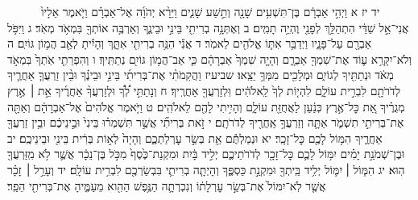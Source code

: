 \documentclass[twoside, openany, parskip=half, 11pt]{book}
\begin{document}
　　　יד יז א וַיְהִ֣י אַבְרָ֔ם בֶּן־תִּשְׁעִ֥ים שָׁנָ֖ה וְתֵ֣שַׁע שָׁנִ֑ים וַיֵּרָ֨א יְהֹוָ֜ה אֶל־אַבְרָ֗ם וַיֹּ֤אמֶר אֵלָיו֙ אֲנִי־אֵ֣ל שַׁדַּ֔י הִתְהַלֵּ֥ךְ לְפָנַ֖י וֶהְיֵ֥ה תָמִֽים׃ ב וְאֶתְּנָ֥ה בְרִיתִ֖י בֵּינִ֣י וּבֵינֶ֑ךָ וְאַרְבֶּ֥ה אוֹתְךָ֖ בִּמְאֹ֥ד מְאֹֽד׃ ג וַיִּפֹּ֥ל אַבְרָ֖ם עַל־פָּנָ֑יו וַיְדַבֵּ֥ר אִתּ֛וֹ אֱלֹהִ֖ים לֵאמֹֽר׃ ד אֲנִ֕י הִנֵּ֥ה בְרִיתִ֖י אִתָּ֑ךְ וְהָיִ֕יתָ לְאַ֖ב הֲמ֥וֹן גּוֹיִֽם׃ ה וְלֹא־יִקָּרֵ֥א ע֛וֹד אֶת־שִׁמְךָ֖ אַבְרָ֑ם וְהָיָ֤ה שִׁמְךָ֙ אַבְרָהָ֔ם כִּ֛י אַב־הֲמ֥וֹן גּוֹיִ֖ם נְתַתִּֽיךָ׃ ו וְהִפְרֵתִ֤י אֹֽתְךָ֙ בִּמְאֹ֣ד מְאֹ֔ד וּנְתַתִּ֖יךָ לְגוֹיִ֑ם וּמְלָכִ֖ים מִמְּךָ֥ יֵצֵֽאוּ׃ שביעיז וַהֲקִמֹתִ֨י אֶת־בְּרִיתִ֜י בֵּינִ֣י וּבֵינֶ֗ךָ וּבֵ֨ין זַרְעֲךָ֧ אַחֲרֶ֛יךָ לְדֹרֹתָ֖ם לִבְרִ֣ית עוֹלָ֑ם לִהְי֤וֹת לְךָ֙ לֵֽאלֹהִ֔ים וּֽלְזַרְעֲךָ֖ אַחֲרֶֽיךָ׃ ח וְנָתַתִּ֣י לְ֠ךָ֠ וּלְזַרְעֲךָ֨ אַחֲרֶ֜יךָ אֵ֣ת ׀ אֶ֣רֶץ מְגֻרֶ֗יךָ אֵ֚ת כׇּל־אֶ֣רֶץ כְּנַ֔עַן לַאֲחֻזַּ֖ת עוֹלָ֑ם וְהָיִ֥יתִי לָהֶ֖ם לֵאלֹהִֽים׃ ט וַיֹּ֤אמֶר אֱלֹהִים֙ אֶל־אַבְרָהָ֔ם וְאַתָּ֖ה אֶת־בְּרִיתִ֣י תִשְׁמֹ֑ר אַתָּ֛ה וְזַרְעֲךָ֥ אַֽחֲרֶ֖יךָ לְדֹרֹתָֽם׃ י זֹ֣את בְּרִיתִ֞י אֲשֶׁ֣ר תִּשְׁמְר֗וּ בֵּינִי֙ וּבֵ֣ינֵיכֶ֔ם וּבֵ֥ין זַרְעֲךָ֖ אַחֲרֶ֑יךָ הִמּ֥וֹל לָכֶ֖ם כׇּל־זָכָֽר׃ יא וּנְמַלְתֶּ֕ם אֵ֖ת בְּשַׂ֣ר עׇרְלַתְכֶ֑ם וְהָיָה֙ לְא֣וֹת בְּרִ֔ית בֵּינִ֖י וּבֵינֵיכֶֽם׃ יב וּבֶן־שְׁמֹנַ֣ת יָמִ֗ים יִמּ֥וֹל לָכֶ֛ם כׇּל־זָכָ֖ר לְדֹרֹתֵיכֶ֑ם יְלִ֣יד בָּ֔יִת וּמִקְנַת־כֶּ֙סֶף֙ מִכֹּ֣ל בֶּן־נֵכָ֔ר אֲשֶׁ֛ר לֹ֥א מִֽזַּרְעֲךָ֖ הֽוּא׃ יג הִמּ֧וֹל ׀ יִמּ֛וֹל יְלִ֥יד בֵּֽיתְךָ֖ וּמִקְנַ֣ת כַּסְפֶּ֑ךָ וְהָיְתָ֧ה בְרִיתִ֛י בִּבְשַׂרְכֶ֖ם לִבְרִ֥ית עוֹלָֽם׃ יד וְעָרֵ֣ל ׀ זָכָ֗ר אֲשֶׁ֤ר לֹֽא־יִמּוֹל֙ אֶת־בְּשַׂ֣ר עׇרְלָת֔וֹ וְנִכְרְתָ֛ה הַנֶּ֥פֶשׁ הַהִ֖וא מֵעַמֶּ֑יהָ אֶת־בְּרִיתִ֖י הֵפַֽר׃
\end{document}
